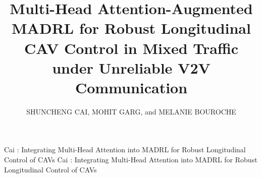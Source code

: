 \documentclass{ieeeaccess}
\begin{document}

\title{Multi-Head Attention-Augmented MADRL for Robust Longitudinal CAV Control in Mixed Traffic under Unreliable V2V Communication}

\author{\uppercase{Shuncheng Cai},
\uppercase{Mohit Garg}, and \uppercase{Melanie Bouroche}}

\address[1]{School of Computer Science and Statistics, Trinity College Dublin, Dublin, Ireland (e-mail: cais@tcd.ie; melanie.bouroche@tcd.ie)}
\address[2]{School of Computing, National College of Ireland, Dublin, Ireland (e-mail: mohit.garg@ncirl.ie)}


\markboth
{Cai \headeretal: Integrating Multi-Head Attention into MADRL for Robust Longitudinal Control of CAVs}
{Cai \headeretal: Integrating Multi-Head Attention into MADRL for Robust Longitudinal Control of CAVs}

\end{document}
